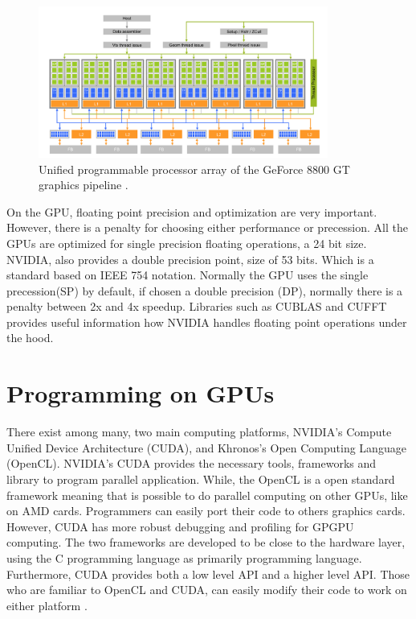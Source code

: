 \begin{figure}[htbp]
	\centering
		\includegraphics[width=0.85\textwidth]{Figures/arch.png}
		\smallskip
	\caption[GPU archiqutecture]{Unified programmable processor array of the GeForce 8800 GT graphics pipeline \cite{hwu}.}
	\label{fig:arch}
\end{figure}

On the GPU, floating point precision and optimization are very important. However, there is a penalty for choosing either performance or precession. All the GPUs are optimized for single precision floating operations, a 24 bit size. NVIDIA, also provides a double precision point, size of  53 bits. Which is a standard based on  IEEE 754 notation. Normally the GPU uses the single precession(SP) by default, if chosen a double precision (DP), normally there is a penalty between 2x and 4x speedup\cite{precision}. Libraries such as CUBLAS and CUFFT provides useful information how NVIDIA handles floating point operations under the hood.

\section{Programming on GPUs}

There exist among many, two main computing platforms, NVIDIA's Compute Unified Device Architecture (CUDA), and Khronos's Open Computing Language (OpenCL). NVIDIA's CUDA provides the necessary tools, frameworks and library to program parallel application. While, the OpenCL is a open standard framework meaning that is possible to do parallel computing on other GPUs, like on AMD cards. Programmers can easily port their code to others graphics cards.  However, CUDA has more robust debugging and profiling for GPGPU computing. The two frameworks are developed to be close to the hardware layer, using the C programming language as primarily programming language. Furthermore, CUDA provides both a low level API and a higher level API. Those who are familiar to OpenCL and CUDA, can easily modify their code to work on either platform \cite{hwu}.

